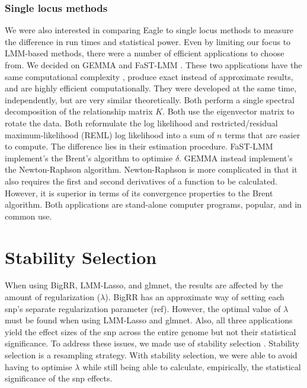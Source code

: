 \documentclass{nature}
\begin{document}
\subsubsection{Single locus methods}

We were also interested in comparing Eagle to single locus methods to measure the difference in run times and statistical power. Even by limiting our focus to LMM-based methods, there were a number of efficient applications to choose from. 
We decided on GEMMA \cite{zhou2012genome} and FaST-LMM \cite{lippert2011fast}. These two applications have the same computational complexity \cite{zhou2012genome}, produce exact instead of approximate results, and are highly efficient computationally. They were developed at the same time, independently, but are very similar theoretically. Both perform a single spectral decomposition of the relationship matrix $K$. Both use the eigenvector matrix to rotate the data. Both reformulate the log likelihood and 
restricted/residual maximum-likelihood (REML) 
log likelihood into a sum of $n$ terms that are easier to compute. The difference lies in their estimation procedure. FaST-LMM implement's the Brent's algorithm to optimise $\delta$. GEMMA instead implement's the Newton-Raphson algorithm. Newton-Raphson is more complicated in that it also requires the first and second derivatives of a function to be calculated. However, it is superior in terms of its convergence properties to the Brent algorithm.  Both applications are stand-alone computer programs, popular, and in common use.


\section{Stability Selection}
When using BigRR, LMM-Lasso, and glmnet, the results are affected by the amount of regularization ($\lambda$). 
BigRR has an approximate way of setting each snp's separate regularization parameter (ref). However, the optimal value of 
$\lambda$ must be found when using LMM-Lasso and glmnet. Also, 
all three applications yield the effect sizes of the snp across the entire genome but not their statistical significance. To address 
these issues, we made use of stability selection \cite{meinshausen2010stability}. 
Stability selection is a resampling strategy.  With stability selection, we were able to avoid having to optimise $\lambda$ while 
still being able to calculate, empirically, the statistical significance of the snp effects.
\end{document}
